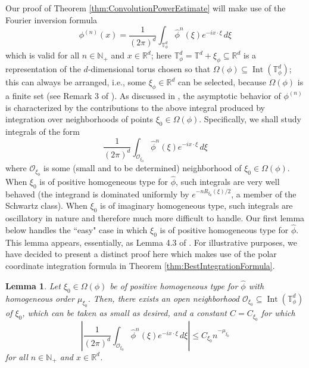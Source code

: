 \documentclass[11pt]{article}
\newtheorem{lemma}[theorem]{Lemma}
\theoremstyle{remark}
\newcommand\Interior{\operatorname{Int}}
\begin{document}
\noindent Our proof of Theorem \ref{thm:ConvolutionPowerEstimate} will make use of the Fourier inversion formula
\begin{equation}\label{eq:FourierInversionConvolutionPower}
\phi^{(n)}(x)=\frac{1}{(2\pi)^d}\int_{\mathbb{T}_\phi^d}\widehat{\phi}^n(\xi)e^{-ix\cdot\xi}\,d\xi
\end{equation}
which is valid for all $n\in\mathbb{N}_+$ and $x\in\mathbb{R}^d$; here $\mathbb{T}_\phi^d=\mathbb{T}^d+\xi_\phi\subseteq\mathbb{R}^d$
is a representation of the $d$-dimensional torus chosen so that $\Omega(\phi)\subseteq \Interior(\mathbb{T}_{\phi}^d)$; this can always be arranged, i.e., some $\xi_\phi\in\mathbb{R}^d$ can be selected, because $\Omega(\phi)$ is a finite set (see Remark 3 of \cite{randles_convolution_2017}). As discussed in \cite{randles_convolution_2017}, the asymptotic behavior of $\phi^{(n)}$ is characterized by the contributions to the above integral produced by integration over neighborhoods of points $\xi_0\in\Omega(\phi).$ Specifically, we shall study integrals of the form
\begin{equation}\label{eq:LocalizedFourierInversionConvolutionPower}
\frac{1}{(2\pi)^d}\int_{\mathcal{O}_{\xi_0}}\widehat{\phi}^n(\xi)e^{-ix\cdot\xi}\,d\xi
\end{equation}
where $\mathcal{O}_{\xi_0}$ is some (small and to be determined) neighborhood of $\xi_0\in\Omega(\phi)$. When $\xi_0$ is of positive homogeneous type for $\widehat{\phi}$, such integrals are very well behaved (the integrand is dominated uniformly by $e^{-nR_{\xi_0}(\xi)/2}$, a member of the Schwartz class). When $\xi_0$ is of imaginary homogeneous type, such integrals are oscillatory in nature and therefore much more difficult to handle. Our first lemma below handles the ``easy" case in which $\xi_0$ is of positive homogeneous type for $\widehat{\phi}$. This lemma appears, essentially, as Lemma 4.3 of \cite{randles_convolution_2017}. For illustrative purposes, we have decided to present a distinct proof here which makes use of the polar coordinate integration formula in Theorem \ref{thm:BestIntegrationFormula}. 
\begin{lemma}\label{lem:EstPosHom}
Let $\xi_0\in\Omega(\phi)$ be of positive homogeneous type for $\widehat{\phi}$ with homogeneous order $\mu_{\xi_0}$. Then, there exists an open neighborhood $\mathcal{O}_{\xi_0}\subseteq\Interior(\mathbb{T}^d_\phi)$ of $\xi_0$, which can be taken as small as desired, and a constant $C=C_{\xi_0}$ for which
\begin{equation*}
    \left|\frac{1}{(2\pi)^d}\int_{\mathcal{O}_{\xi_0}}\widehat{\phi}^n(\xi)e^{-ix\cdot\xi}\,d\xi\right|\leq 
    C_{\xi_0} n^{-\mu_{\xi_0}}
\end{equation*}
for all $n\in\mathbb{N}_+$ and $x\in\mathbb{R}^d$.
\end{lemma}
\end{document}
